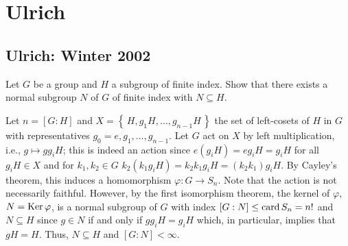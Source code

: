 \section{Ulrich}
\subsection{Ulrich: Winter 2002}
\setcounter{exercise}{0}
\setcounter{equation}{0}

\begin{problem}
  Let $G$ be a group and $H$ a subgroup of finite index. Show that there
  exists a normal subgroup $N$ of $G$ of finite index with $N\subseteq H$.
\end{problem}
\begin{solution}
  Let $n=[G:H]$ and $X=\left\{\,H,g_1H,\ldots,g_{n-1}H\,\right\}$ the set
  of left-cosets of $H$ in $G$ with representatives
  $g_0=e,g_1,\ldots,g_{n-1}$. Let $G$ act on $X$ by left multiplication,
  i.e., $g\mapsto g g_iH$; this is indeed an action since
  $e(g_iH)=eg_iH=g_iH$ for all $g_iH\in X$ and for $k_1,k_2\in G$
  $k_2(k_1g_iH)=k_2k_1g_iH=(k_2k_1)g_iH$. By Cayley's theorem, this induces
  a homomorphism $\varphi\colon G\to S_n$. Note that the action is not
  necessarily faithful. However, by the first isomorphism theorem, the
  kernel of $\varphi$, $N=\operatorname{Ker}\varphi$, is a normal subgroup of $G$ with
  index $[G:N]\leq \operatorname{card} S_n=n!$ and $N\subseteq H$ since $g\in N$ if and
  only if $gg_iH=g_iH$ which, in particular, implies that $gH=H$. Thus,
  $N\subseteq H$ and $[G:N]<\infty$.
\end{solution}


